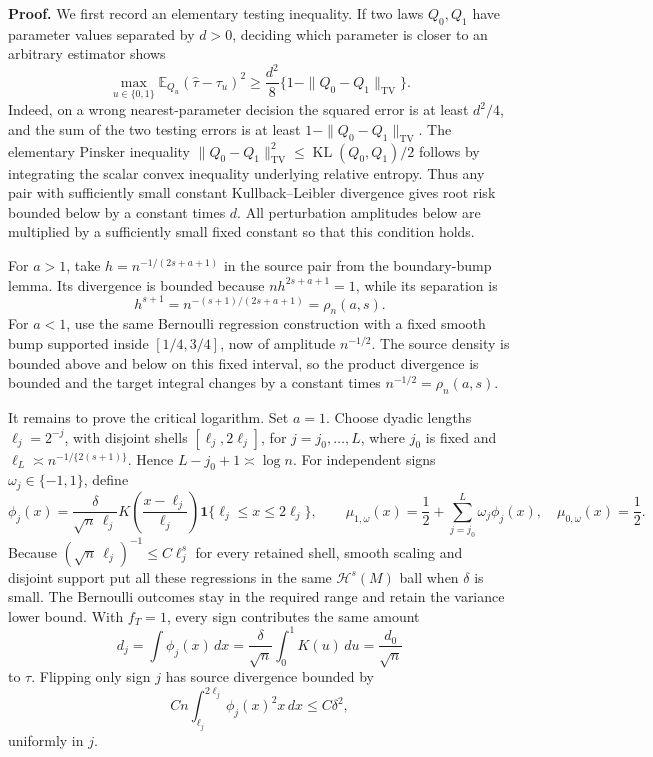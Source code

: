 \textbf{Proof.}
We first record an elementary testing inequality.  If two laws \(Q_0,Q_1\) have parameter values separated by \(d>0\), deciding which parameter is closer to an arbitrary estimator shows
\[
 \max_{u\in\{0,1\}}\mathbb E_{Q_u}(\widehat\tau-\tau_u)^2
 \ge \frac{d^2}{8}\{1-\|Q_0-Q_1\|_{\mathrm{TV}}\}.
\]
Indeed, on a wrong nearest-parameter decision the squared error is at least \(d^2/4\), and the sum of the two testing errors is at least \(1-\|Q_0-Q_1\|_{\mathrm{TV}}\).  The elementary Pinsker inequality \(\|Q_0-Q_1\|_{\mathrm{TV}}^2\le\operatorname{KL}(Q_0,Q_1)/2\) follows by integrating the scalar convex inequality underlying relative entropy.  Thus any pair with sufficiently small constant Kullback--Leibler divergence gives root risk bounded below by a constant times \(d\).  All perturbation amplitudes below are multiplied by a sufficiently small fixed constant so that this condition holds.

For \(a>1\), take \(h=n^{-1/(2s+a+1)}\) in the source pair from the boundary-bump lemma.  Its divergence is bounded because \(nh^{2s+a+1}=1\), while its separation is
\[
 h^{s+1}=n^{-(s+1)/(2s+a+1)}=\rho_n(a,s).
\]
For \(a<1\), use the same Bernoulli regression construction with a fixed smooth bump supported inside \([1/4,3/4]\), now of amplitude \(n^{-1/2}\).  The source density is bounded above and below on this fixed interval, so the product divergence is bounded and the target integral changes by a constant times \(n^{-1/2}=\rho_n(a,s)\).

It remains to prove the critical logarithm.  Set \(a=1\).  Choose dyadic lengths \(\ell_j=2^{-j}\), with disjoint shells \([\ell_j,2\ell_j]\), for \(j=j_0,\ldots,L\), where \(j_0\) is fixed and \(\ell_L\asymp n^{-1/\{2(s+1)\}}\).  Hence \(L-j_0+1\asymp\log n\).  For independent signs \(\omega_j\in\{-1,1\}\), define
\[
 \phi_j(x)=\frac{\delta}{\sqrt n\,\ell_j}
 K\!\left(\frac{x-\ell_j}{\ell_j}\right)
 \mathbf 1\{\ell_j\le x\le2\ell_j\},
 \qquad
 \mu_{1,\omega}(x)=\frac12+\sum_{j=j_0}^L\omega_j\phi_j(x),
 \quad \mu_{0,\omega}(x)=\frac12.
\]
Because \((\sqrt n\,\ell_j)^{-1}\le C\ell_j^s\) for every retained shell, smooth scaling and disjoint support put all these regressions in the same \(\mathcal H^s(M)\) ball when \(\delta\) is small.  The Bernoulli outcomes stay in the required range and retain the variance lower bound.  With \(f_T=1\), every sign contributes the same amount
\[
 d_j=\int\phi_j(x)\,dx
 =\frac{\delta}{\sqrt n}\int_0^1K(u)\,du
 =\frac{d_0}{\sqrt n}
\]
to \(\tau\).  Flipping only sign \(j\) has source divergence bounded by
\[
 Cn\int_{\ell_j}^{2\ell_j}\phi_j(x)^2x\,dx
 \le C\delta^2,
\]
uniformly in \(j\).


